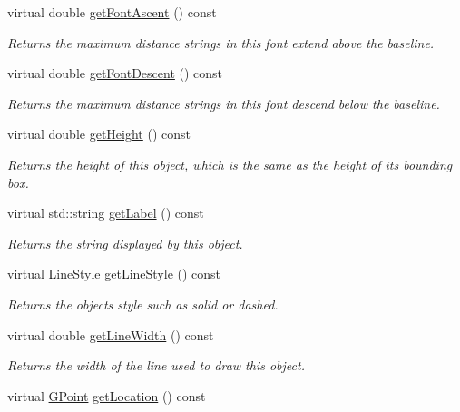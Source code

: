 \begin{DoxyCompactItemize}
virtual double \mbox{\hyperlink{classGText_ab7583914978530e097034293e9d316ad}{get\+Font\+Ascent}} () const
\begin{DoxyCompactList}\small\item\em Returns the maximum distance strings in this font extend above the baseline. \end{DoxyCompactList}\item 
virtual double \mbox{\hyperlink{classGText_a2908216e19046c9747c0fc3b0d088621}{get\+Font\+Descent}} () const
\begin{DoxyCompactList}\small\item\em Returns the maximum distance strings in this font descend below the baseline. \end{DoxyCompactList}\item 
virtual double \mbox{\hyperlink{classGObject_a1e7e353362434072875264cf95629f99}{get\+Height}} () const
\begin{DoxyCompactList}\small\item\em Returns the height of this object, which is the same as the height of its bounding box. \end{DoxyCompactList}\item 
virtual std\+::string \mbox{\hyperlink{classGText_aa73aa351564b091c0658f2368c6d5c5f}{get\+Label}} () const
\begin{DoxyCompactList}\small\item\em Returns the string displayed by this object. \end{DoxyCompactList}\item 
virtual \mbox{\hyperlink{classGObject_a86e0f5648542856159bb40775c854aa7}{Line\+Style}} \mbox{\hyperlink{classGObject_aaf1f5ea8281e5e3486662878d26f0a13}{get\+Line\+Style}} () const
\begin{DoxyCompactList}\small\item\em Returns the object\textquotesingle{}s style such as solid or dashed. \end{DoxyCompactList}\item 
virtual double \mbox{\hyperlink{classGObject_a85ff266dc3eb63d9f2d8e5a4487fd3c0}{get\+Line\+Width}} () const
\begin{DoxyCompactList}\small\item\em Returns the width of the line used to draw this object. \end{DoxyCompactList}\item 
virtual \mbox{\hyperlink{classGPoint}{G\+Point}} \mbox{\hyperlink{classGObject_a4f83802015511edeb63b892830812c11}{get\+Location}} () const

\end{DoxyCompactItemize}
